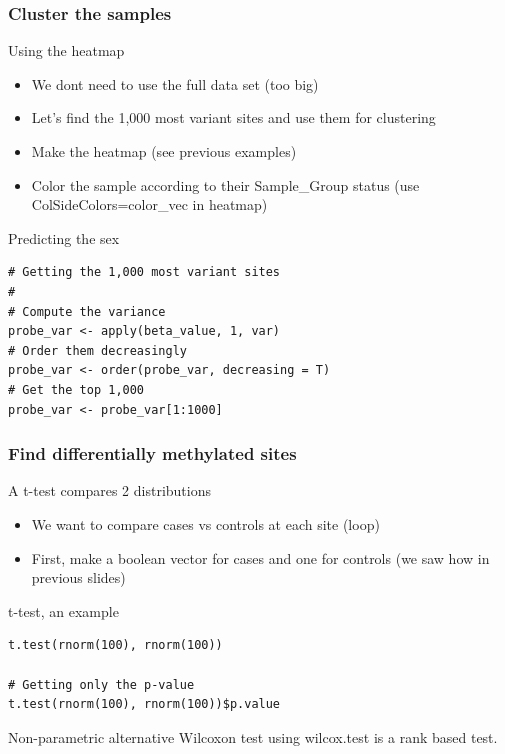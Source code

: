 \documentclass[10pt]{beamer}
\newenvironment{xframe}[2][]
  {\begin{frame}[fragile,environment=xframe,#1]
  \frametitle{#2}}
  {\end{frame}}
\begin{document}
\begin{xframe}{Cluster the samples}
  \begin{block}{Using the heatmap}
    \begin{itemize}
      \item We dont need to use the full data set (too big)
      \item Let's find the 1,000 most variant sites and use them for clustering
      \item Make the heatmap (see previous examples)
      \item Color the sample according to their Sample\_Group status (use
      ColSideColors=color\_vec in heatmap)
    \end{itemize}
      \end{block}
    \begin{exampleblock}{Predicting the sex}
\begin{verbatim}
# Getting the 1,000 most variant sites
#
# Compute the variance
probe_var <- apply(beta_value, 1, var)
# Order them decreasingly
probe_var <- order(probe_var, decreasing = T)
# Get the top 1,000
probe_var <- probe_var[1:1000]
\end{verbatim}  
  \end{exampleblock}   

\end{xframe}


\begin{xframe}{Find differentially methylated sites}
  \begin{block}{A t-test compares 2 distributions}
    \begin{itemize}
      \item We want to compare {\sf cases} vs {\sf controls} at each site
      (loop)
      \item First, make a boolean vector for cases and one for controls (we saw
      how in previous slides)
    \end{itemize}
      \end{block}
    \begin{exampleblock}{t-test, an example}
\begin{verbatim}
t.test(rnorm(100), rnorm(100))

# Getting only the p-value
t.test(rnorm(100), rnorm(100))$p.value

\end{verbatim}  
  \end{exampleblock}   
    \begin{alertblock}{Non-parametric alternative}
      Wilcoxon test using {\sf wilcox.test} is a rank based test.
    \end{alertblock}
\end{xframe}
\end{document}
